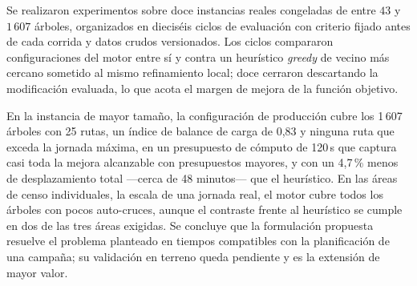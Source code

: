 Se realizaron experimentos sobre doce instancias reales
congeladas de entre $43$ y $1\,607$ árboles, organizados en dieciséis ciclos de evaluación con
criterio fijado antes de cada corrida y datos crudos versionados. Los ciclos
compararon configuraciones del motor entre sí y contra un heurístico \textit{greedy} de vecino más
cercano sometido al mismo refinamiento local; doce cerraron descartando la modificación evaluada,
lo que acota el margen de mejora de la función objetivo.

En la instancia de mayor tamaño, la configuración de producción cubre los 1\,607 árboles con 25
rutas, un índice de balance de carga de 0{,}83 y ninguna ruta que exceda la jornada máxima, en un
presupuesto de cómputo de 120\,s que captura casi toda la mejora alcanzable con presupuestos
mayores,
y con un 4{,}7\,\% menos de desplazamiento total ---cerca de 48 minutos---
que el heurístico. En las áreas de censo individuales, la escala de una jornada real, el motor
cubre todos los árboles con pocos auto-cruces, aunque el contraste frente al heurístico
se cumple en dos de las tres áreas exigidas. Se concluye que la formulación propuesta resuelve el
problema planteado en tiempos compatibles con la planificación de una campaña; su validación en
terreno queda pendiente y es la extensión de mayor valor.

\newpage